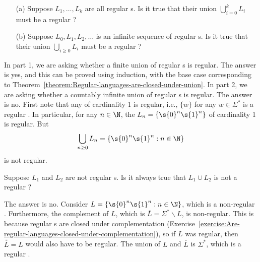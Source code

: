 % 

\begin{flex}
\begin{exercise} \label{exercise:Finite-vs-infinite-union}
\begin{enumerate}
    \item[(a)] Suppose $L_1, \ldots, L_k$ are all regular s. 
    Is it true that their union $\bigcup_{i=0}^k L_i$ must be a regular ?      
    \item[(b)] Suppose $L_0, L_1, L_2, \ldots$ is an infinite sequence of regular s. 
    Is it true that their union $\bigcup_{i\geq 0} L_i$ must be a regular ?
\end{enumerate}
\end{exercise}


\begin{solution}
In part 1, we are asking whether a finite union of regular s is regular. The answer is yes, and this can be proved using induction, with the base case corresponding to Theorem~\ref{theorem:Regular-languages-are-closed-under-union}. In part 2, we are asking whether a countably infinite union of regular s is regular. The answer is no. First note that any  of cardinality 1 is regular, i.e., $\{w\}$ for any $w \in \Sigma^*$ is a regular . In particular, for any $n \in \N$, the  $L_n = \{\s{0}^n\s{1}^n\}$ of cardinality 1 is regular. But
\[
\bigcup_{n\geq 0} L_n = \{\s{0}^n\s{1}^n : n \in \N\}
\]
is not regular.
\end{solution}
\end{flex}


\begin{flex}
\begin{exercise} \label{exercise:Union-of-irregular-languages}
Suppose $L_1$ and $L_2$ are not regular s. 
Is it always true that $L_1 \cup L_2$ is not a regular ?
\end{exercise}


\begin{solution}
The answer is no. Consider $L = \{\s{0}^n\s{1}^n : n \in \N\}$, which is a non-regular . Furthermore, the complement of $L$, which is $\overline{L} = \Sigma^* \backslash L$, is non-regular. This is because regular s are closed under complementation (Exercise~\ref{exercise:Are-regular-languages-closed-under-complementation}), so if $\overline{L}$ was regular, then $\overline{\overline{L}} = L$ would also have to be regular. The union of $L$ and $\overline{L}$ is $\Sigma^*$, which is a regular .
\end{solution}
\end{flex}



